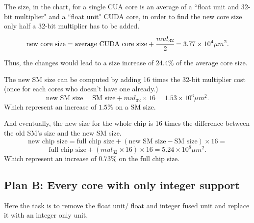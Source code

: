 \documentclass{report}
\begin{document}
    The size, in the chart, for a single CUA core is an average of a ``float unit and 32-bit multiplier"
    and a ``float unit" CUDA core, in order to find the new core size only half a 32-bit multiplier has to be added.
    \[\text{new core size} = \text{average CUDA core size} + \cfrac{mul_{32}}{2} = 3.77 \times 10^4 \mu m^2 .\] 
    
    Thus, the changes would lead to a size increase of $24.4\%$ of the average core size.
    
    The new SM size can be computed by adding 16 times the 32-bit multiplier cost (once for each cores who doesn't have one already.)
    \[\text{new SM size} = \text{SM size} + mul_{32} \times 16 = 1.53 \times 10^6 \mu m^2 .\]
    Which represent an increase of $1.5\%$ on a SM size.
    
    And eventually, the new size for the whole chip is 16 times the difference between the old SM's size and the new SM size.
    \[\text{new chip size} = \text{full chip size} + (\text{new SM size} - \text{SM size}) \times 16 =\]
    \[\text{full chip size} + (mul_{32} \times 16) \times  16 = 5.24 \times 10^8 \mu m^2 .\]
    Which represent an increase of $0.73\%$ on the full chip size.
   
   \subsection{Plan B: Every core with only integer support}
   Here the task is to remove the float unit/ float and integer fused unit and replace it with an integer only unit.
   
\end{document}
